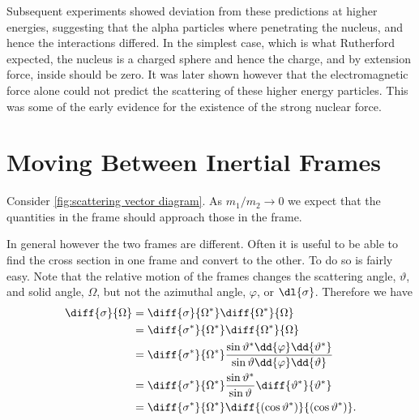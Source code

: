     Subsequent experiments showed deviation from these predictions at higher energies, suggesting that the alpha particles where penetrating the nucleus, and hence the interactions differed.
    In the simplest case, which is what Rutherford expected, the nucleus is a charged sphere and hence the charge, and by extension force, inside should be zero.
    It was later shown however that the electromagnetic force alone could not predict the scattering of these higher energy particles.
    This was some of the early evidence for the existence of the strong nuclear force.
    
    \section{Moving Between Inertial Frames}
    Consider \cref{fig:scattering vector diagram}.
    As \(m_1/m_2 \to 0\) we expect that the quantities in the \CM{} frame should approach those in the \LAB{} frame.
    
    In general however the two frames are different.
    Often it is useful to be able to find the cross section in one frame and convert to the other.
    To do so is fairly easy.
    Note that the relative motion of the frames changes the scattering angle, \(\vartheta\), and solid angle, \(\Omega\), but not the azimuthal angle, \(\varphi\), or \(\dl{\sigma}\).
    Therefore we have
    \begin{align}
        \diff{\sigma}{\Omega} &= \diff{\sigma}{\Omega^*}\diff{\Omega^*}{\Omega}\\
        &= \diff{\sigma^*}{\Omega^*}\diff{\Omega^*}{\Omega}\\
        &= \diff{\sigma^*}{\Omega^*} \frac{\sin\vartheta^* \dd{\varphi}\dd{\vartheta^*}}{\sin\vartheta \dd{\varphi} \dd{\vartheta}}\\
        &= \diff{\sigma^*}{\Omega^*} \frac{\sin\vartheta^*}{\sin\vartheta} \diff{\vartheta^*}{\vartheta^*}\\
        &= \diff{\sigma^*}{\Omega^*} \diff{(\cos\vartheta^*)}{(\cos\vartheta^*)}.
    \end{align}
    

